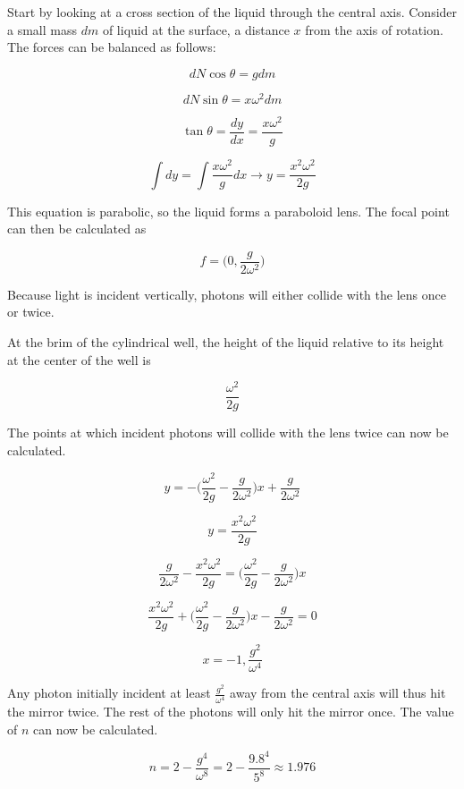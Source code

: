 \begin{solution}
    Start by looking at a cross section of the liquid through the central axis. Consider a small mass $dm$ of liquid at the surface, a distance $x$ from the axis of rotation. The forces can be balanced as follows:

$$dN\cos{\theta} = gdm$$

$$dN\sin{\theta} = x\omega^2dm$$

$$\tan{\theta} = \frac{dy}{dx} = \frac{x\omega^2}{g}$$

$$\int dy = \int\frac{x\omega^2}{g}dx\longrightarrow y = \frac{x^2\omega^2}{2g}$$

This equation is parabolic, so the liquid forms a paraboloid lens. The focal point can then be calculated as 

$$f = \bigg(0, \frac{g}{2\omega^2}\bigg)$$

Because light is incident vertically, photons will either collide with the lens once or twice.

At the brim of the cylindrical well, the height of the liquid relative to its height at the center of the well is

$$\frac{\omega^2}{2g}$$

The points at which incident photons will collide with the lens twice can now be calculated.

$$y = -\bigg(\frac{\omega^2}{2g} - \frac{g}{2\omega^2}\bigg)x + \frac{g}{2\omega^2}$$

$$y = \frac{x^2\omega^2}{2g}$$

$$\frac{g}{2\omega^2} - \frac{x^2\omega^2}{2g} = \bigg(\frac{\omega^2}{2g} - \frac{g}{2\omega^2}\bigg)x$$

$$\frac{x^2\omega^2}{2g} + \bigg(\frac{\omega^2}{2g} - \frac{g}{2\omega^2}\bigg)x - \frac{g}{2\omega^2} = 0$$

$$x = -1, \frac{g^2}{\omega^4}$$

Any photon initially incident at least $\frac{g^2}{\omega^4}$ away from the central axis will thus hit the mirror twice. The rest of the photons will only hit the mirror once. The value of $n$ can now be calculated.

$$n = 2 - \frac{g^4}{\omega^8} = 2 - \frac{9.8^4}{5^8} \approx \boxed{1.976}$$


\end{solution}